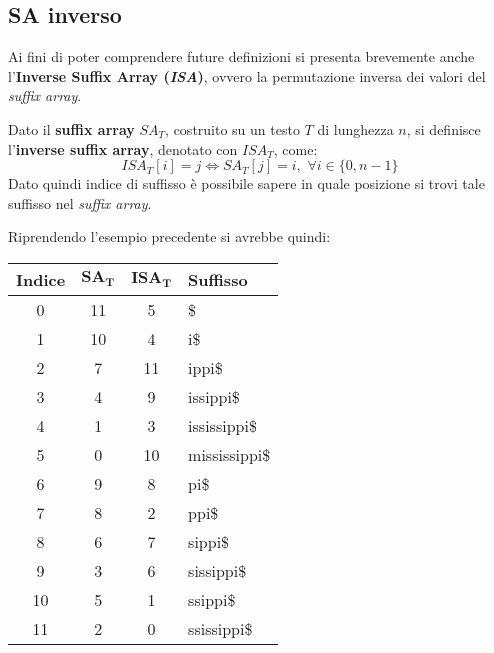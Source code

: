\subsection{SA inverso}
Ai fini di poter comprendere future definizioni si presenta brevemente anche
l'\textbf{Inverse Suffix Array (\textit{ISA})}, ovvero la permutazione inversa
dei valori del \textit{suffix array}.
\begin{definizione}
  Dato il \textbf{suffix array} $SA_T$, costruito su un testo $T$ di lunghezza
  $n$, si definisce l'\textbf{inverse suffix array}, denotato con $ISA_T$, come:
  \[ISA_T[i]=j\iff SA_T[j]=i,\,\,\forall i\in\{0,n-1\}\]
    Dato quindi indice di suffisso è possibile sapere in quale posizione si trovi
    tale suffisso nel \textit{suffix array}.  
  \end{definizione}

\begin{esempio}
  Riprendendo l'esempio precedente si avrebbe quindi:
  \begin{table}[H]
    \centering
    \footnotesize
    \begin{tabular}{c|c|c|l} 
      \textbf{Indice} & $\mathbf{SA_T}$ & $\mathbf{ISA_T}$ & \textbf{Suffisso}\\ 
      \hline
      0 & 11 & 5 & \$\\
      1 & 10 & 4 & i\$\\
      2 & 7 & 11 & ippi\$\\
      3 & 4 & 9 & issippi\$\\
      4 & 1 & 3 & ississippi\$\\
      5 & 0 & 10 & mississippi\$\\
      6 & 9 & 8 & pi\$\\
      7 & 8 & 2 & ppi\$\\
      8 & 6 & 7 & sippi\$\\
      9 & 3 & 6 & sissippi\$\\
      10 & 5 & 1 & ssippi\$\\
      11 & 2 & 0 & ssissippi\$\\
    \end{tabular}
  \end{table}
\end{esempio}
